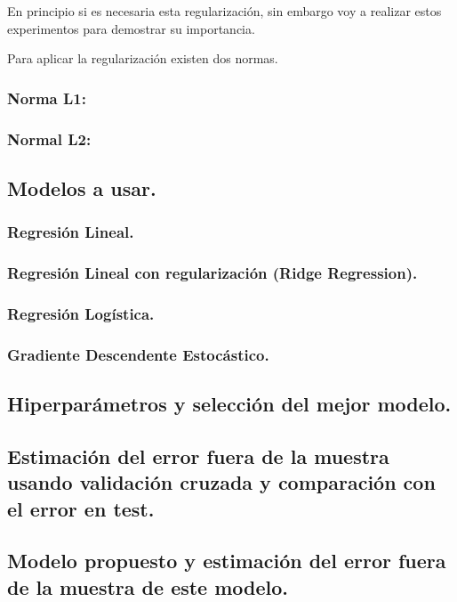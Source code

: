\documentclass[12pt, spanish]{article}
\begin{document}
En principio si es necesaria esta regularización, sin embargo voy a realizar estos experimentos para demostrar su importancia.

Para aplicar la regularización existen dos normas\cite{l1l2regularizacion}.

\subsubsection{Norma L1: }

\subsubsection{Normal L2:}

\subsection{Modelos a usar.}


\subsubsection{Regresión Lineal.}

\subsubsection{Regresión Lineal con regularización (Ridge Regression).}

\subsubsection{Regresión Logística.}

\subsubsection{Gradiente Descendente Estocástico.}


\subsection{Hiperparámetros y selección del mejor modelo.}

\subsection{Estimación del error fuera de la muestra usando validación cruzada y comparación con el error en test.}

\subsection{Modelo propuesto y estimación del error fuera de la muestra de este modelo.}
\end{document}
